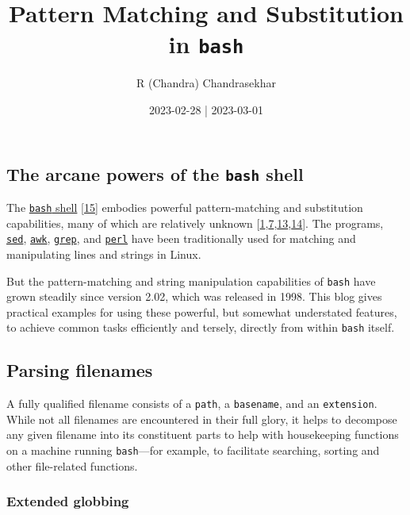 \documentclass[
  a4paper,
]{article}
\title{Pattern Matching and Substitution in \texttt{bash}}
\author{R (Chandra) Chandrasekhar}
\date{2023-02-28 | 2023-03-01}
\begin{document}
\maketitle

\thispagestyle{empty}


\hypertarget{the-arcane-powers-of-the-bash-shell}{%
\subsection{\texorpdfstring{The arcane powers of the \texttt{bash}
shell}{The arcane powers of the bash shell}}\label{the-arcane-powers-of-the-bash-shell}}

The \href{https://www.gnu.org/software/bash/}{\texttt{bash} shell}
{[}\protect\hyperlink{ref-newham2005}{15}{]} embodies powerful
pattern-matching and substitution capabilities, many of which are
relatively unknown
{[}\protect\hyperlink{ref-gnupattern}{1},\protect\hyperlink{ref-parametersubs}{7},\protect\hyperlink{ref-frazier2019}{13},\protect\hyperlink{ref-stringops}{14}{]}.
The programs, \href{https://www.gnu.org/software/sed/}{\texttt{sed}},
\href{https://www.grymoire.com/Unix/Awk.html}{\texttt{awk}},
\href{https://www.gnu.org/software/grep/manual/grep.html}{\texttt{grep}},
and
\href{https://learnbyexample.github.io/learn_perl_oneliners/line-processing.html}{\texttt{perl}}
have been traditionally used for matching and manipulating lines and
strings in Linux.

But the pattern-matching and string manipulation capabilities of
\texttt{bash} have grown steadily since version 2.02, which was released
in 1998. This blog gives practical examples for using these powerful,
but somewhat understated features, to achieve common tasks efficiently
and tersely, directly from within \texttt{bash} itself.

\hypertarget{parsing-filenames}{%
\subsection{Parsing filenames}\label{parsing-filenames}}

A fully qualified filename consists of a \texttt{path}, a
\texttt{basename}, and an \texttt{extension}. While not all filenames
are encountered in their full glory, it helps to decompose any given
filename into its constituent parts to help with housekeeping functions
on a machine running \texttt{bash}---for example, to facilitate
searching, sorting and other file-related functions.

\hypertarget{extended-globbing}{%
\subsubsection{Extended globbing}\label{extended-globbing}}
\end{document}
